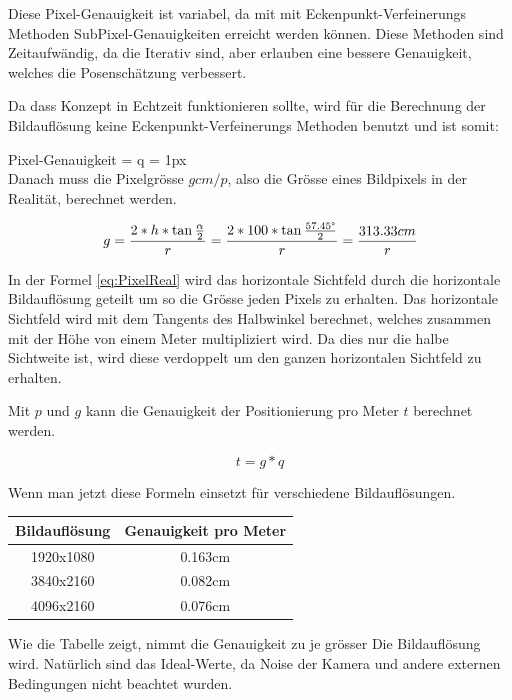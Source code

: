 Diese Pixel-Genauigkeit ist variabel, da mit mit Eckenpunkt-Verfeinerungs Methoden SubPixel-Genauigkeiten erreicht werden können.
Diese Methoden sind Zeitaufwändig, da die Iterativ sind, aber erlauben eine bessere Genauigkeit, welches die Posenschätzung verbessert.

Da dass Konzept in Echtzeit funktionieren sollte, wird für die Berechnung der Bildauflösung keine Eckenpunkt-Verfeinerungs Methoden benutzt und ist somit:

Pixel-Genauigkeit = q = 1px\\

Danach muss die Pixelgrösse \(g cm/p\), also die Grösse eines Bildpixels in der Realität, berechnet werden.

\begin{equation}
g = \frac{2*h*\tan\frac{\alpha}{2}}{r} = \frac{2*100*\tan\frac{57.45\degree}{2}}{r} = \frac{313.33cm}{r}
\label{eq:PixelReal}
\end{equation}

In der Formel \ref{eq:PixelReal} wird das horizontale Sichtfeld durch die horizontale Bildauflösung geteilt um so die Grösse jeden Pixels zu erhalten.
Das horizontale Sichtfeld wird mit dem Tangents des Halbwinkel berechnet, welches zusammen mit der Höhe von einem Meter multipliziert wird.
Da dies nur die halbe Sichtweite ist, wird diese verdoppelt um den ganzen horizontalen Sichtfeld zu erhalten.

Mit \(p\) und \(g\) kann die Genauigkeit der Positionierung pro Meter \(t\)  berechnet werden.

\begin{equation}
t = g * q
\label{eq:precision}
\end{equation}

Wenn man jetzt diese Formeln einsetzt für verschiedene Bildauflösungen.

\begin{center}
    \begin{tabular}{ c c}
    \label{tab:resolutions}
     Bildauflösung & Genauigkeit pro Meter\\ 
     \hline
     1920x1080 & 0.163cm \\  
     3840x2160 & 0.082cm \\
     4096x2160 & 0.076cm \\ 
\end{tabular}
\end{center}

Wie die Tabelle zeigt, nimmt die Genauigkeit zu je grösser Die Bildauflösung wird. 
Natürlich sind das Ideal-Werte, da Noise der Kamera und andere externen Bedingungen nicht beachtet wurden. 
